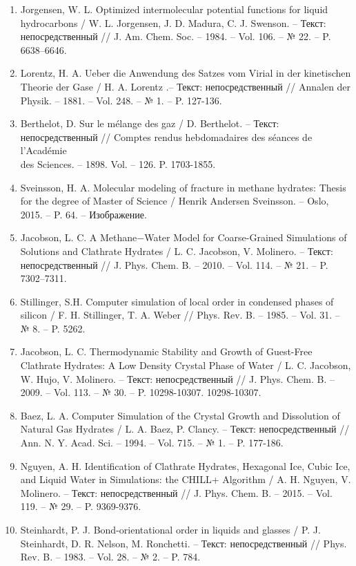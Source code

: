 \begin{enumerate}
    \item Jorgensen, W. L. Optimized intermolecular potential functions for liquid hydrocarbons / W. L. Jorgensen, J. D. Madura, C. J. Swenson. -- Текст: непосредственный // J. Am. Chem. Soc. --  1984. -- Vol. 106. -- № 22. -- P. 6638–6646.
    \item Lorentz, H. A. Ueber die Anwendung des Satzes vom Virial in der kinetischen Theorie der Gase / H. A. Lorentz .-- Текст: непосредственный // Annalen der Physik. -- 1881. -- Vol. 248. -- № 1. -- P. 127-136.
    \item Berthelot, D. Sur le mélange des gaz / D. Berthelot. -- Текст: непосредственный // Comptes rendus hebdomadaires des séances de l’Académie \\ des Sciences. --  1898. Vol. -- 126. P. 1703-1855.
    \item Sveinsson, H. A. Molecular modeling of fracture in methane
    hydrates: Thesis for the degree of Master of Science / Henrik Andersen Sveinsson. -- Oslo, 2015. -- P. 64. -- Изображение.
    \item Jacobson, L. C. A Methane−Water Model for Coarse-Grained Simulations of Solutions and Clathrate Hydrates / L. C. Jacobson, V. Molinero. -- Текст: непосредственный // J. Phys. Chem. B. -- 2010. -- Vol. 114. -- № 21. -- P. 7302–7311.
    \item Stillinger, S.H. Computer simulation of local order in condensed phases of silicon / F. H. Stillinger, T. A. Weber // Phys. Rev. B. -- 1985. -- Vol. 31. -- № 8. -- P. 5262.
    \item Jacobson, L. C. Thermodynamic Stability and Growth of Guest-Free Clathrate Hydrates: A Low Density Crystal Phase of Water / L. C. Jacobson, W. Hujo, V. Molinero. -- Текст: непосредственный // J. Phys. Chem. B. -- 2009. -- Vol. 113. -- № 30. -- P. 10298-10307.
    10298-10307.
    \item Baez, L. A. Computer Simulation of the Crystal Growth and Dissolution of Natural Gas Hydrates / L. A. Baez, P. Clancy. -- Текст: непосредственный // Ann. N. Y. Acad. Sci. -- 1994. -- Vol. 715. --  № 1. -- P. 177-186.
    \item Nguyen, A. H. Identification of Clathrate Hydrates, Hexagonal Ice, Cubic Ice, and Liquid Water in Simulations: the CHILL+ Algorithm / A. H. Nguyen, V. Molinero. -- Текст: непосредственный // J. Phys. Chem. B. -- 2015. -- Vol. 119. -- № 29. -- P. 9369-9376.
    \item Steinhardt, P. J. Bond-orientational order in liquids and glasses / P. J. Steinhardt, D. R. Nelson, M. Ronchetti. -- Текст: непосредственный // Phys. Rev. B. -- 1983. -- Vol. 28. -- № 2. -- P. 784.

\end{enumerate}

